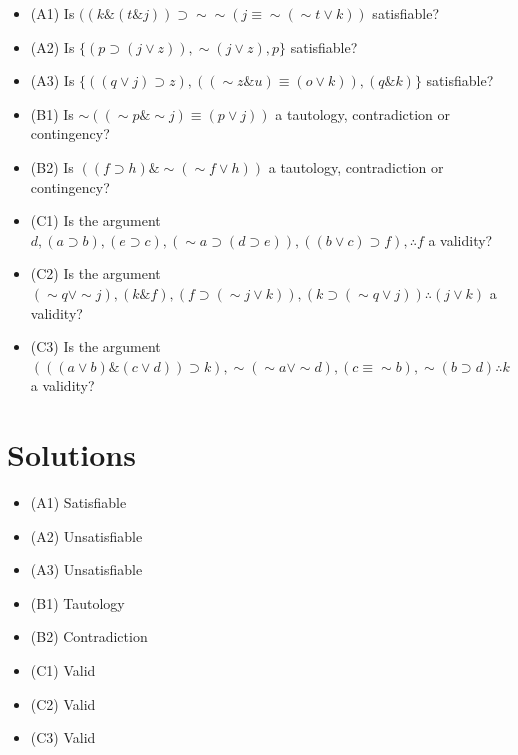 \documentclass[
]{book}
\providecommand{\tightlist}{%
  \setlength{\itemsep}{0pt}\setlength{\parskip}{0pt}}
\begin{document}
\begin{itemize}
\tightlist
\item
  (A1) Is \(((k \& (t \& j)) \supset \sim \sim (j \equiv \sim (\sim t \lor k))\) satisfiable?
\item
  (A2) Is \(\{(p \supset (j \lor z)), \sim (j \lor z), p\}\) satisfiable?
\item
  (A3) Is \(\{((q \lor j) \supset z), ((\sim z \& u) \equiv (o \lor k)), (q \& k)\}\) satisfiable?
\item
  (B1) Is \(\sim ((\sim p \& \sim j) \equiv (p \lor j))\) a tautology, contradiction or contingency?
\item
  (B2) Is \(((f \supset h) \& \sim(\sim f \lor h))\) a tautology, contradiction or contingency?
\item
  (C1) Is the argument \(d, (a \supset b), (e \supset c), (\sim a \supset (d \supset e)), ((b \lor c) \supset f), \therefore f\) a validity?
\item
  (C2) Is the argument \((\sim q \lor \sim j),(k \& f), (f \supset (\sim j \lor k)), (k \supset (\sim q \lor j)) \therefore (j \lor k)\) a validity?
\item
  (C3) Is the argument \((((a \lor b) \& (c \lor d)) \supset k), \sim(\sim a \lor \sim d), (c \equiv \sim b), \sim (b \supset d) \therefore k\) a validity?
\end{itemize}

\hypertarget{solutions-1}{%
\section{Solutions}\label{solutions-1}}

\begin{itemize}
\tightlist
\item
  (A1) Satisfiable
\item
  (A2) Unsatisfiable
\item
  (A3) Unsatisfiable
\item
  (B1) Tautology
\item
  (B2) Contradiction
\item
  (C1) Valid
\item
  (C2) Valid
\item
  (C3) Valid
\end{itemize}

  
\end{document}
